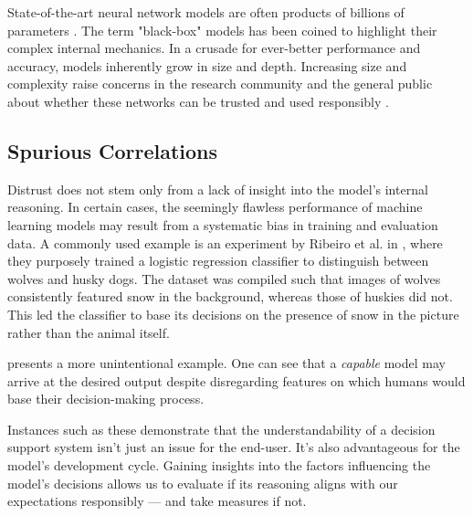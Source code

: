 State-of-the-art neural network models are often products of billions of parameters \cite{arrieta-taxonomy}.
The term "black-box" models has been coined to highlight their complex internal mechanics.
In a crusade for ever-better performance and accuracy, models inherently grow in size and depth.
Increasing size and complexity raise concerns in the research community and the general public about whether these networks can be trusted and used responsibly \cite{arrieta-taxonomy, xai-survey}.

\subsection*{Spurious Correlations}

Distrust does not stem only from a lack of insight into the model's internal reasoning.
In certain cases, the seemingly flawless performance of machine learning models may result from a systematic bias in training and evaluation data.
A commonly used example is an experiment by Ribeiro et al. in \cite{xai-husky}, where they purposely trained a logistic regression classifier to distinguish between wolves and husky dogs.
The dataset was compiled such that images of wolves consistently featured snow in the background, whereas those of huskies did not.
This led the classifier to base its decisions on the presence of snow in the picture rather than the animal itself. 

 presents a more unintentional example.
One can see that a \emph{capable} model may arrive at the desired output despite disregarding features on which humans would base their decision-making process. 

Instances such as these demonstrate that the understandability of a decision support system isn't just an issue for the end-user.
It's also advantageous for the model's development cycle.
Gaining insights into the factors influencing the model's decisions allows us to evaluate if its reasoning aligns with our expectations responsibly --- and take measures if not.

